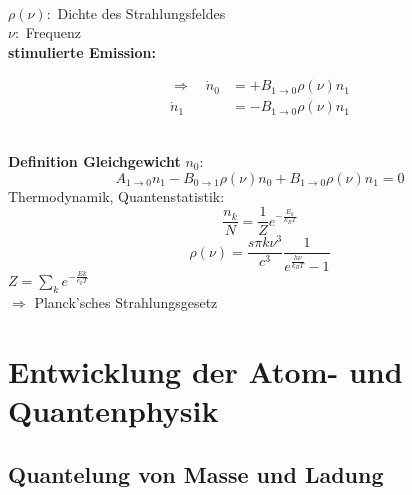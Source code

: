 \documentclass[titlepage,11pt,a4paper,ngerman]{report}
\begin{document}
\\[15pt]
$ \rho(\nu) : $ Dichte des Strahlungsfeldes\\
$ \nu : $ Frequenz\\[5pt]
\textbf{stimulierte Emission:}\\
\begin{minipage}{.5\linewidth}
	\begin{align*}
	\Rightarrow \quad \dot{n}_0 &= + B_{1 \to 0} \rho(\nu) n_1 \\
	\dot{n}_1 &= - B_{1 \to 0} \rho(\nu) n_1
	\end{align*}
\end{minipage}%
\begin{minipage}{.5\linewidth}
	\centering
\end{minipage}%
\\[15pt]
\textbf{Definition Gleichgewicht}
$ n_0 : $
\begin{equation*}
A_{1 \to 0} n_1 - B_{0 \to 1} \rho(\nu) n_0 + B_{1 \to 0} \rho(\nu) n_1 = 0
\end{equation*}
Thermodynamik, Quantenstatistik:
\begin{equation*}
\frac{n_k}{N} = \frac{1}{Z} e^{-\frac{E_k}{k_B T}}
\end{equation*}
\begin{equation*}
\rho(\nu) = \frac{s \pi k \nu^3}{c^3} \frac{1}{e^{\frac{h \nu}{k_B T}} - 1}
\end{equation*}
$ Z = \sum_k e^{-\frac{E k}{e_k T}} $\\[5pt]
$ \Rightarrow $ Planck'sches Strahlungsgesetz

\chapter{Entwicklung der Atom- und Quantenphysik}

\section{Quantelung von Masse und Ladung}
\end{document}
